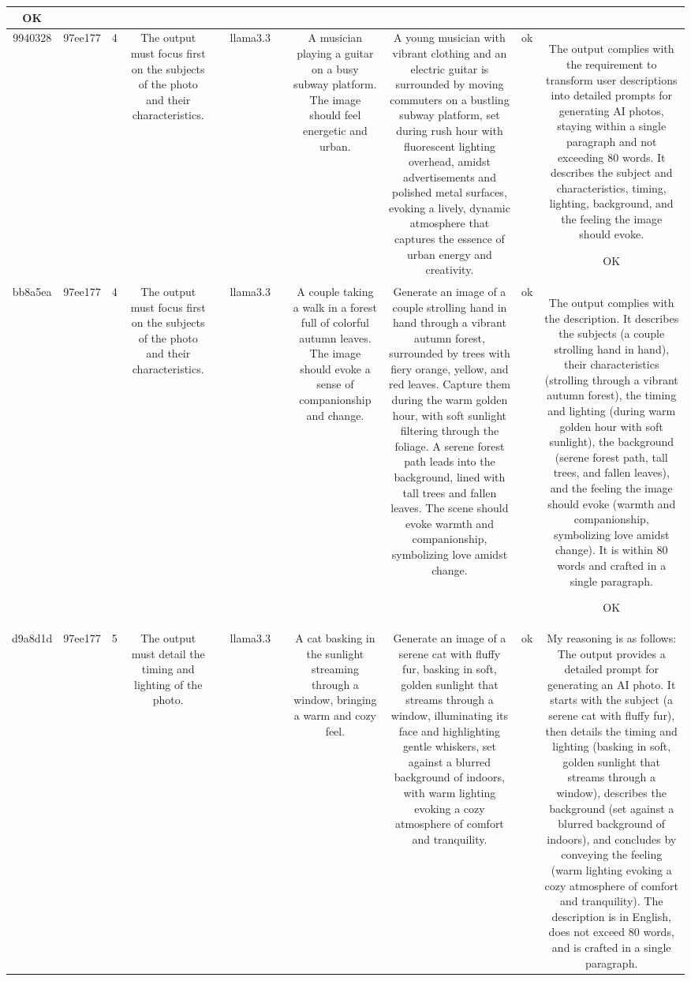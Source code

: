 \begin{table}[h!]
\begin{tabular}{|c|c|c|c|c|c|c|c|c|c|c|}
OK\\
\hline
9940328 & 97ee177 & 4 & The output must focus first on the subjects of the photo and their characteristics. &  & llama3.3 &  & A musician playing a guitar on a busy subway platform. The image should feel energetic and urban. & A young musician with vibrant clothing and an electric guitar is surrounded by moving commuters on a bustling subway platform, set during rush hour with fluorescent lighting overhead, amidst advertisements and polished metal surfaces, evoking a lively, dynamic atmosphere that captures the essence of urban energy and creativity. & ok & The output complies with the requirement to transform user descriptions into detailed prompts for generating AI photos, staying within a single paragraph and not exceeding 80 words. It describes the subject and characteristics, timing, lighting, background, and the feeling the image should evoke.

OK\\
\hline
bb8a5ea & 97ee177 & 4 & The output must focus first on the subjects of the photo and their characteristics. &  & llama3.3 &  & A couple taking a walk in a forest full of colorful autumn leaves. The image should evoke a sense of companionship and change. & Generate an image of a couple strolling hand in hand through a vibrant autumn forest, surrounded by trees with fiery orange, yellow, and red leaves. Capture them during the warm golden hour, with soft sunlight filtering through the foliage. A serene forest path leads into the background, lined with tall trees and fallen leaves. The scene should evoke warmth and companionship, symbolizing love amidst change. & ok & The output complies with the description. It describes the subjects (a couple strolling hand in hand), their characteristics (strolling through a vibrant autumn forest), the timing and lighting (during warm golden hour with soft sunlight), the background (serene forest path, tall trees, and fallen leaves), and the feeling the image should evoke (warmth and companionship, symbolizing love amidst change). It is within 80 words and crafted in a single paragraph.

OK\\
\hline
d9a8d1d & 97ee177 & 5 & The output must detail the timing and lighting of the photo. &  & llama3.3 &  & A cat basking in the sunlight streaming through a window, bringing a warm and cozy feel. & Generate an image of a serene cat with fluffy fur, basking in soft, golden sunlight that streams through a window, illuminating its face and highlighting gentle whiskers, set against a blurred background of indoors, with warm lighting evoking a cozy atmosphere of comfort and tranquility. & ok & My reasoning is as follows: The output provides a detailed prompt for generating an AI photo. It starts with the subject (a serene cat with fluffy fur), then details the timing and lighting (basking in soft, golden sunlight that streams through a window), describes the background (set against a blurred background of indoors), and concludes by conveying the feeling (warm lighting evoking a cozy atmosphere of comfort and tranquility). The description is in English, does not exceed 80 words, and is crafted in a single paragraph.


\end{tabular}
\end{table}
